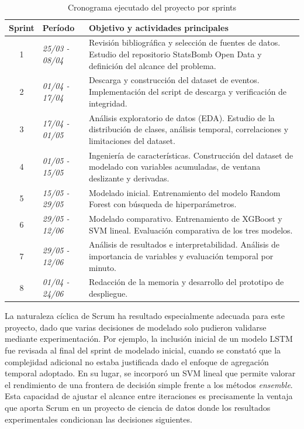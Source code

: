 \begin{table}[H]
    \centering
    \begin{tabularx}{\textwidth}{|c|p{3cm}|X|}
        \hline
        \textbf{Sprint} & \textbf{Período}       & \textbf{Objetivo y actividades principales}                                                                                                \\
        \hline
        1               & \textit{25/03 - 08/04} & Revisión bibliográfica y selección de fuentes de datos. Estudio del repositorio StatsBomb Open Data y definición del alcance del problema. \\
        2               & \textit{01/04 - 17/04} & Descarga y construcción del dataset de eventos. Implementación del script de descarga y verificación de integridad.                        \\
        3               & \textit{17/04 - 01/05} & Análisis exploratorio de datos (EDA). Estudio de la distribución de clases, análisis temporal, correlaciones y limitaciones del dataset.   \\
        4               & \textit{01/05 - 15/05} & Ingeniería de características. Construcción del dataset de modelado con variables acumuladas, de ventana deslizante y derivadas.           \\
        5               & \textit{15/05 - 29/05} & Modelado inicial. Entrenamiento del modelo Random Forest con búsqueda de hiperparámetros.                                                  \\
        6               & \textit{29/05 - 12/06} & Modelado comparativo. Entrenamiento de XGBoost y SVM lineal. Evaluación comparativa de los tres modelos.                                   \\
        7               & \textit{29/05 - 12/06} & Análisis de resultados e interpretabilidad. Análisis de importancia de variables y evaluación temporal por minuto.                         \\
        8               & \textit{01/04 - 24/06} & Redacción de la memoria y desarrollo del prototipo de despliegue.                                                                          \\
        \hline
    \end{tabularx}
    \caption{Cronograma ejecutado del proyecto por sprints}
    \label{tab:cronograma}
\end{table}

La naturaleza cíclica de Scrum ha resultado especialmente adecuada para este proyecto, dado que varias decisiones de modelado solo pudieron validarse mediante experimentación. Por ejemplo, la inclusión inicial de un modelo LSTM fue revisada al final del sprint de modelado inicial, cuando se constató que la complejidad adicional no estaba justificada dado el enfoque de agregación temporal adoptado. En su lugar, se incorporó un SVM lineal que permite valorar el rendimiento de una frontera de decisión simple frente a los métodos \textit{ensemble}. Esta capacidad de ajustar el alcance entre iteraciones es precisamente la ventaja que aporta Scrum en un proyecto de ciencia de datos donde los resultados experimentales condicionan las decisiones siguientes.

